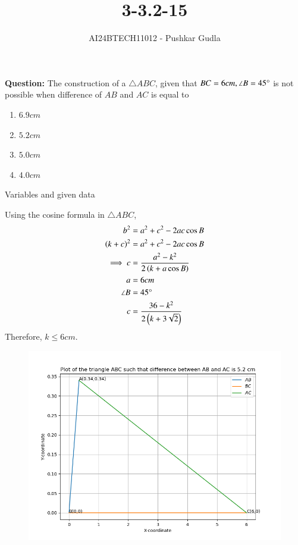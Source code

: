 \documentclass[journal]{IEEEtran}
\begin{document}

\vspace{3cm}

\title{3-3.2-15}
\author{AI24BTECH11012 - Pushkar Gudla}
{\let\newpage\relax\maketitle}

\renewcommand{\thefigure}{\theenumi}
\renewcommand{\thetable}{\theenumi}
\setlength{\intextsep}{10pt} %


\renewcommand{\thetable}{\theenumi}
\textbf{Question:} The construction of a $\triangle ABC$, given that $BC=6cm, \angle B=45\degree$ is not possible when difference of $AB$ and $AC$ is equal to\begin{enumerate}
	\item $6.9cm$
	\item $5.2cm$
	\item $5.0cm$
	\item $4.0cm$
\end{enumerate}
\solution
\begin{table}[h!]    
  \centering
  
  \caption{Variables and given data}
  \label{tab 3.2.15}
\end{table}
Using the cosine formula in $\triangle ABC$,\\
\begin{align}
	b^2 &= a^2 + c^2 - 2ac\cos B \\
	\left(k+c\right)^2 &= a^2 + c^2 - 2ac\cos B \\
	\implies c &= \frac{a^2 - k^2}{2\left(k + a\cos B\right)}\\
	a &= 6cm \\
	\angle B &= 45\degree \\
	c &= \frac{36-k^2}{2\left(k + 3\sqrt{2}\right)}\\	
\end{align}
Therefore, $k \leq 6cm $.
\begin{figure}[h]
	\centering
	\includegraphics[scale=0.5]{figs/plot1.png}
	\label{Fig}
\end{figure}
\end{document}
